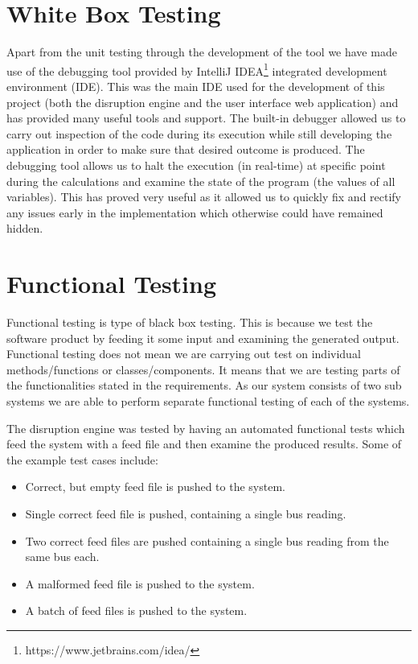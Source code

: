 \section{White Box Testing}
Apart from the unit testing through the development of the tool we have made use of the debugging tool provided by IntelliJ IDEA\footnote{https://www.jetbrains.com/idea/} integrated development environment (IDE). This was the main IDE used for the development of this project (both the disruption engine and the user interface web application) and has provided many useful tools and support. The built-in debugger allowed us to carry out inspection of the code during its execution while still developing the application in order to make sure that desired outcome is produced. The debugging tool allows us to halt the execution (in real-time) at specific point during the calculations and examine the state of the program (the values of all variables). This has proved very useful as it allowed us to quickly fix and rectify any issues early in the implementation which otherwise could have remained hidden.

\section{Functional Testing}
Functional testing is type of black box testing. This is because we test the software product by feeding it some input and examining the generated output. Functional testing does not mean we are carrying out test on individual methods/functions or classes/components. It means that we are testing parts of the functionalities stated in the requirements. As our system consists of two sub systems we are able to perform separate functional testing of each of the systems.

The disruption engine was tested by having an automated functional tests which feed the system with a feed file and then examine the produced results. Some of the example test cases include:
\begin{itemize}
	\item Correct, but empty feed file is pushed to the system.
	\item Single correct feed file is pushed, containing a single bus reading.
	\item Two correct feed files are pushed containing a single bus reading from the same bus each.
	\item A malformed feed file is pushed to the system.
	\item A batch of feed files is pushed to the system.
\end{itemize}

